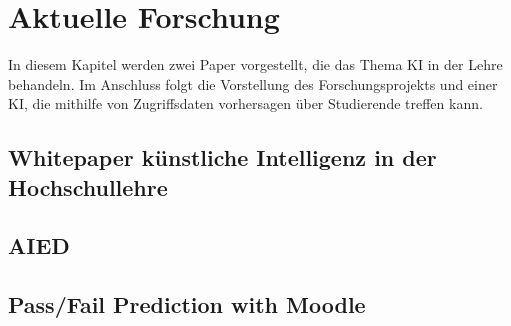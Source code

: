 \chapter{Aktuelle Forschung}
In diesem Kapitel werden zwei Paper vorgestellt, die das Thema KI in der Lehre behandeln.
Im Anschluss folgt die Vorstellung des Forschungsprojekts und einer KI, die mithilfe von Zugriffsdaten vorhersagen über Studierende treffen kann.

\section{Whitepaper künstliche Intelligenz in der Hochschullehre}

\section{AIED}

\section{Pass/Fail Prediction with Moodle}
